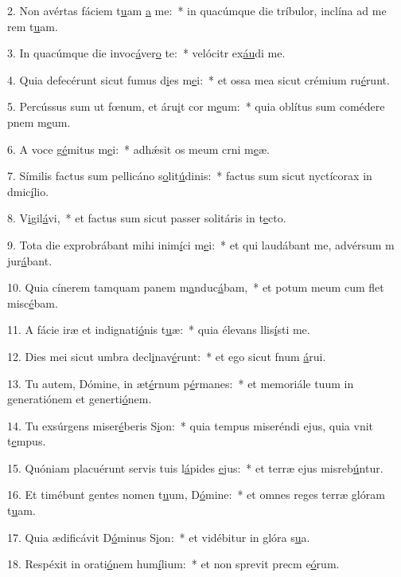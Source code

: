 2. Non avértas fáciem t\uline{u}am \uline{a} me:~* in quacúmque die tríbulor, inclína ad me rem t\uline{u}am.\par 
3. In quacúmque die invoc\uline{á}ver\uline{o} te:~* velócitr ex\uline{áu}di me.\par 
4. Quia defecérunt sicut fumus d\uline{i}es m\uline{e}i:~* et ossa mea sicut crémium ru\uline{é}runt.\par 
5. Percússus sum ut fœnum, et áru\uline{i}t cor m\uline{e}um:~* quia oblítus sum comédere pnem m\uline{e}um.\par 
6. A voce g\uline{é}mitus m\uline{e}i:~* adhǽsit os meum crni m\uline{e}æ.\par 
7. Símilis factus sum pellicáno s\uline{o}lit\uline{ú}dinis:~* factus sum sicut nyctícorax in dmic\uline{í}lio.\par 
8. V\uline{i}gil\uline{á}vi,~* et factus sum sicut passer solitáris in t\uline{e}cto.\par 
9. Tota die exprobrábant mihi inim\uline{í}ci m\uline{e}i:~* et qui laudábant me, advérsum m jur\uline{á}bant.\par 
10. Quia cínerem tamquam panem m\uline{a}nduc\uline{á}bam,~* et potum meum cum flet misc\uline{é}bam.\par 
11. A fácie iræ et indignati\uline{ó}nis t\uline{u}æ:~* quia élevans llis\uline{í}sti me.\par 
12. Dies mei sicut umbra decl\uline{i}nav\uline{é}runt:~* et ego sicut fnum \uline{á}rui.\par 
13. Tu autem, Dómine, in æt\uline{é}rnum p\uline{é}rmanes:~* et memoriále tuum in generatiónem et generti\uline{ó}nem.\par 
14. Tu exsúrgens miser\uline{é}beris S\uline{i}on:~* quia tempus miseréndi ejus, quia vnit t\uline{e}mpus.\par 
15. Quóniam placuérunt servis tuis l\uline{á}pides \uline{e}jus:~* et terræ ejus misreb\uline{ú}ntur.\par 
16. Et timébunt gentes nomen t\uline{u}um, D\uline{ó}mine:~* et omnes reges terræ glóram t\uline{u}am.\par 
17. Quia ædificávit D\uline{ó}minus S\uline{i}on:~* et vidébitur in glóra s\uline{u}a.\par 
18. Respéxit in orati\uline{ó}nem hum\uline{í}lium:~* et non sprevit precm e\uline{ó}rum.\par 
